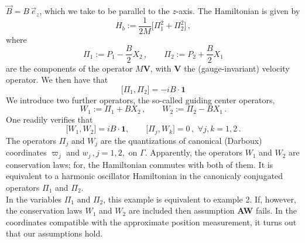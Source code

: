 \documentclass[11pt]{article}
\begin{document}
\begin{enumerate}
		$\vec{B}= B\,\vec{e}_{z}$, which we take to be parallel to the $z$-axis. The Hamiltonian is given by
		\begin{equation}\label{magn-field}
		H_{b} :=  \frac{1}{2M} \big[ \Pi_1 ^2 + \Pi_2 ^2 \big]\,,
		\end{equation}
		where 
		\begin{equation}\label{velocities}
		\Pi_1 := P_1 - \frac{B}{2} X_2 \,,\qquad \Pi_2 := P_2 + \frac{B}{2} X_1 
		\end{equation}
		are the components of the operator $M\mathbf{V}$, with $\mathbf{V}$ the (gauge-invariant) velocity operator.
		We then have that
		\begin{equation}\label{magn-transl}
		\big[\Pi_1 , \Pi_2 \big] = -i B \cdot \mathbf{1}
		\end{equation}
		We introduce two further operators, the so-called guiding center operators,
		\begin{equation}\label{guiding-centers}
		W_1 := \Pi_1 + B X_2\,, \qquad W_2 := \Pi_2 - B X_1\,.
		\end{equation}
		One readily verifies that 
		\begin{equation}\label{W}
		\big[W_1 , W_2 \big] = iB\cdot \mathbf{1}, \qquad \big[\Pi_j, W_k \big] =0\,,\,\, \forall j, k =1,2\,.
		\end{equation}
		The operators $\Pi_j$ and $W_j$ are the quantizations of canonical (Darboux) coordinates $\varpi_j$ and $w_j\,, j=1,2,$ on $\Gamma$. Apparently, the operators $W_1$ and $W_2$ are conservation laws; for, the Hamiltonian commutes with both of them. It is equivalent to a harmonic oscillator Hamiltonian in the canonicaly conjugated operators $\Pi_1$ and 
		$\Pi_2$.\\
		In the variables $\Pi_1$ and $\Pi_2$, this example is equivalent to example 2. If, however, the conservation laws $W_1$ and $W_2$ are included then assumption {\bf{AW}} fails. In the coordinates compatible with the approximate position measurement, it turns out that our assumptions hold.\\
		

\end{enumerate}
\end{document}
